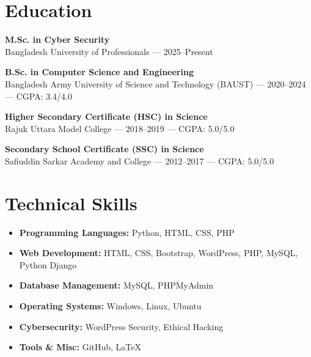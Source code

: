\documentclass[a4paper,10pt]{article}
\begin{document}
\begin{multicols}{2}
    \begin{flushleft}
        \section*{Education}
        \noindent \textbf{M.Sc. in Cyber Security} \\
        Bangladesh University of Professionals — 2025–Present

        \vspace{0.3em}
        \noindent \textbf{B.Sc. in Computer Science and Engineering} \\
        Bangladesh Army University of Science and Technology (BAUST) — 2020–2024 — CGPA: 3.4/4.0

        \vspace{0.3em}
        \noindent \textbf{Higher Secondary Certificate (HSC) in Science} \\
        Rajuk Uttara Model College — 2018–2019 — CGPA: 5.0/5.0

        \vspace{0.3em}
        \noindent \textbf{Secondary School Certificate (SSC) in Science} \\
        Safiuddin Sarkar Academy and College — 2012–2017 — CGPA: 5.0/5.0

        \section*{Technical Skills}
        \begin{itemize}[left=0em, labelsep=1em, label=\textbullet, itemsep=0.2em]
            \item \textbf{Programming Languages:} Python, HTML, CSS, PHP
            \item \textbf{Web Development:} HTML, CSS, Bootstrap, WordPress, PHP, MySQL, Python Django
            \item \textbf{Database Management:} MySQL, PHPMyAdmin
            \item \textbf{Operating Systems:} Windows, Linux, Ubuntu
            \item \textbf{Cybersecurity:} WordPress Security, Ethical Hacking
            \item \textbf{Tools \& Misc:} GitHub, LaTeX
        \end{itemize}


\end{flushleft}
\end{multicols}
\end{document}

